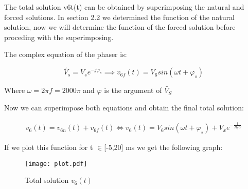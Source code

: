 The total solution v6t(t) can be obtained by superimposing the natural and forced solutions. In section 2.2 we determined the function of the natural solution, now we will determine the function of the forced solution before proceding with the superimposing. 

The complex equation of the phaser is:

\begin{equation}
	\widetilde{V_s}=V_se^{-j\varphi_s} \implies v_{6f}(t)=V_6sin(\omega t+\varphi_s)
\end{equation}

Where $\omega=2\pi f=2000\pi$ and $\varphi$ is the argument of $\widetilde{V_S}$

\vspace{20pt}

Now we can superimpose both equations and obtain the final total solution:

\begin{gather}
	v_6(t)=v_{6n}(t)+v_{6f}(t) \iff v_6(t)=V_6sin(\omega t+\varphi_s)+V_xe^{-\frac{t}{R_5C}}
\end{gather}

If we plot this function for t $\in$[-5,20] ms we get the following graph:

\begin{figure}[h]
	\centering
	\texttt{[image: plot.pdf]}
	\caption{Total solution $v_6(t)$}
	\label{fig:total}
\end{figure}

\newpage
